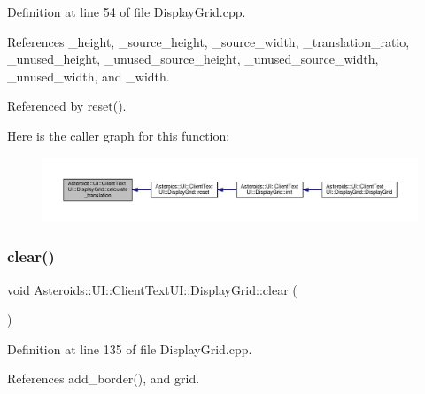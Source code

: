 Definition at line 54 of file Display\+Grid.\+cpp.



References \+\_\+height, \+\_\+source\+\_\+height, \+\_\+source\+\_\+width, \+\_\+translation\+\_\+ratio, \+\_\+unused\+\_\+height, \+\_\+unused\+\_\+source\+\_\+height, \+\_\+unused\+\_\+source\+\_\+width, \+\_\+unused\+\_\+width, and \+\_\+width.



Referenced by reset().

Here is the caller graph for this function\+:\nopagebreak
\begin{figure}[H]
\begin{center}
\leavevmode
\includegraphics[width=350pt]{classAsteroids_1_1UI_1_1ClientTextUI_1_1DisplayGrid_aba2b6b3d0cef0cff63f709207652cf44_icgraph}
\end{center}
\end{figure}
\mbox{\label{classAsteroids_1_1UI_1_1ClientTextUI_1_1DisplayGrid_a7e8af47380bb1c10250090b00b578227}} 
\subsubsection{\texorpdfstring{clear()}{clear()}}
{\footnotesize\ttfamily void Asteroids\+::\+U\+I\+::\+Client\+Text\+U\+I\+::\+Display\+Grid\+::clear (\begin{DoxyParamCaption}{ }\end{DoxyParamCaption})}



Definition at line 135 of file Display\+Grid.\+cpp.



References add\+\_\+border(), and grid.

